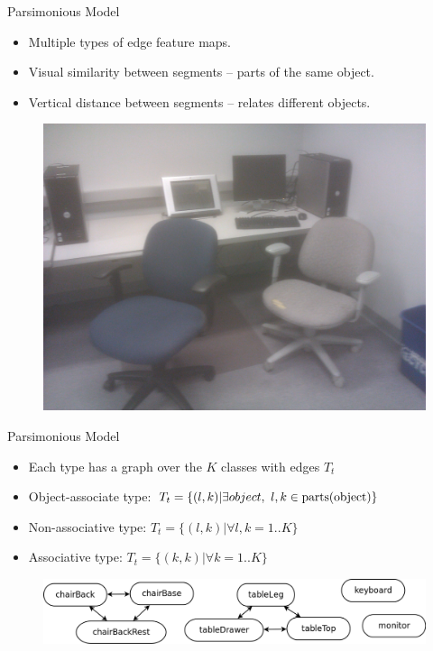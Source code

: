 \documentclass{beamer}
\newcommand{\fe}[3]{{\phi_{#1}(#2,#3)}}%
\newcommand{\we}[3]{{w_{#1}^{#2#3}}}   %
\begin{document}
\begin{frame}{Parsimonious Model}

\begin{itemize}

\item Multiple types of edge feature maps.

\item Visual similarity between segments -- parts of the same object.
\item Vertical distance between segments -- relates different objects.

\end{itemize}
\begin{figure}[t!]
\includegraphics[width=.5\linewidth]{parsi.jpg}
\end{figure}



\end{frame}

\begin{frame}{Parsimonious Model}
\begin{itemize}

\item Each type has a graph over the $K$ classes with edges  $T_t$

\item Object-associate type: $T_t=\{(l,k) | \exists object , ~ l,k\in {\rm parts}({\rm object})\}$
\item Non-associative type: $T_t=\{(l,k)| \forall l,k=1..K\}$
\item Associative type:  ${T_t}=\{(k,k)| \forall k=1..K\}$
\end{itemize}
\hskip 1in
\begin{figure}
		\includegraphics[width=.8\linewidth]{objAssoc.png}
	\end{figure}


\end{frame}
\end{document}
